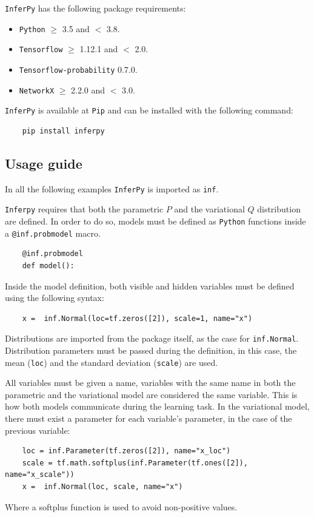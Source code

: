\texttt{InferPy} has the following package requirements:
\begin{itemize}
    \item \texttt{Python} \( \geq\) 3.5 and \( < \) 3.8.
    \item \texttt{Tensorflow} \(\geq\)  1.12.1  and \( < \) 2.0.
    \item \texttt{Tensorflow-probability} 0.7.0.
    \item \texttt{NetworkX} \( \geq \) 2.2.0 and \( < \) 3.0.
\end{itemize}

\texttt{InferPy} is available at \texttt{Pip} and can be installed with the following command:

\begin{verbatim}
    pip install inferpy
\end{verbatim}

\subsection{Usage guide}

In all the following examples \texttt{InferPy} is imported as \texttt{inf}.

\texttt{Inferpy} requires that both the parametric \(P\) and the variational \(Q\) distribution are defined. In order to do so, models must be defined as \texttt{Python} functions inside a \texttt{@inf.probmodel} macro.

\begin{verbatim}
    @inf.probmodel
    def model():
\end{verbatim}

Inside the model definition, both visible and hidden variables must be defined using the following syntax:

\begin{verbatim}
    x =  inf.Normal(loc=tf.zeros([2]), scale=1, name="x")
\end{verbatim}

Distributions are imported from the package itself, as the case for \texttt{inf.Normal}. Distribution parameters must be passed during the definition, in this case, the mean (\texttt{loc}) and the standard deviation (\texttt{scale}) are used.

All variables must be given a name, variables with the same name in both the parametric and the variational model are considered the same variable. This is how both models communicate during the learning task. In the variational model, there must exist a parameter for each variable's parameter, in the case of the previous variable:
\begin{verbatim}
    loc = inf.Parameter(tf.zeros([2]), name="x_loc")
    scale = tf.math.softplus(inf.Parameter(tf.ones([2]), name="x_scale"))
    x =  inf.Normal(loc, scale, name="x")
\end{verbatim}
Where a softplus function is used to avoid non-positive values.

